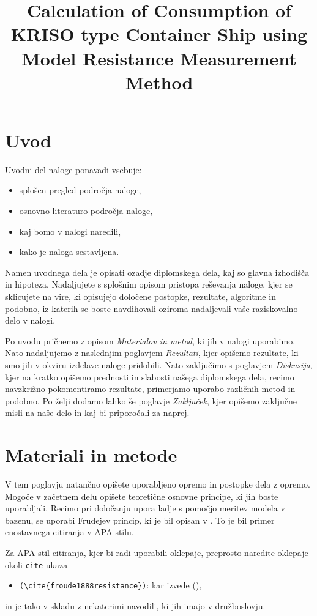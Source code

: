 \documentclass[pomnav, tisk, apa]{fppthesis}
\title{Calculation of Consumption of KRISO type Container Ship using Model Resistance Measurement Method}
\begin{document}
\section{Uvod}
\label{sec:Uvod}

Uvodni del naloge ponavadi vsebuje:

\begin{itemize}[nosep]
	\item splošen pregled področja naloge,
	\item osnovno literaturo področja naloge,
	\item kaj bomo v nalogi naredili,
	\item kako je naloga sestavljena.
\end{itemize}

Namen uvodnega dela je opisati ozadje diplomskega dela, kaj so glavna izhodišča in hipoteza. Nadaljujete s splošnim opisom pristopa reševanja naloge, kjer se sklicujete na vire, ki opisujejo določene postopke, rezultate, algoritme in podobno, iz katerih se boste navdihovali oziroma nadaljevali vaše raziskovalno delo v nalogi.

Po uvodu pričnemo z opisom \textit{Materialov in metod}, ki jih v nalogi uporabimo. Nato nadaljujemo z naslednjim poglavjem \textit{Rezultati}, kjer opišemo rezultate, ki smo jih v okviru izdelave naloge pridobili. Nato zaključimo s poglavjem \textit{Diskusija}, kjer na kratko opišemo prednosti in slabosti našega diplomskega dela, recimo navzkrižno pokomentiramo rezultate, primerjamo uporabo različnih metod in podobno. Po želji dodamo lahko še poglavje \textit{Zaključek}, kjer opišemo zaključne misli na naše delo in kaj bi priporočali za naprej.


\newpage
\section{Materiali in metode}
\label{sec:Materiali}

V tem poglavju natančno opišete uporabljeno opremo in postopke dela z opremo. Mogoče v začetnem delu opišete teoretične osnovne principe, ki jih boste uporabljali. Recimo pri določanju upora ladje s pomočjo meritev modela v bazenu, se uporabi Frudejev princip, ki je bil opisan v \cite{froude1888resistance}. To je bil primer enostavnega citiranja v APA stilu.

Za APA stil citiranja, kjer bi radi uporabili oklepaje, preprosto naredite oklepaje okoli \texttt{cite} ukaza
\begin{itemize}
	\item \texttt{(\textbackslash cite\{froude1888resistance\})}: kar izvede (\cite{froude1888resistance}),
\end{itemize}
in je tako v skladu z nekaterimi navodili, ki jih imajo v družboslovju.
\end{document}

